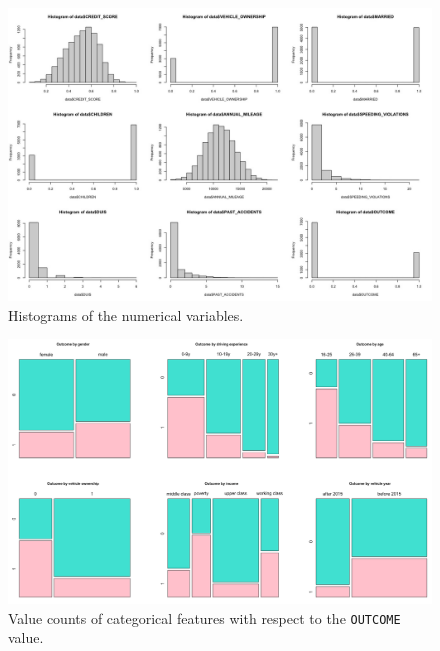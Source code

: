 \documentclass[a4paper,11pt, titlepage]{article}
\begin{document}
\begin{figure}[!h]
    \centering
    \includegraphics[scale=0.35]{eda.jpeg}
    \caption{Histograms of the numerical variables.}
    \label{fig:histograms}
\end{figure}


\begin{figure}[!h]
    \centering
    \includegraphics[scale=0.3]{eda-report.png}
    \caption{Value counts of categorical features with respect to the {\tt OUTCOME} value.}
    \label{fig:categorical-counts}
\end{figure}
\end{document}
